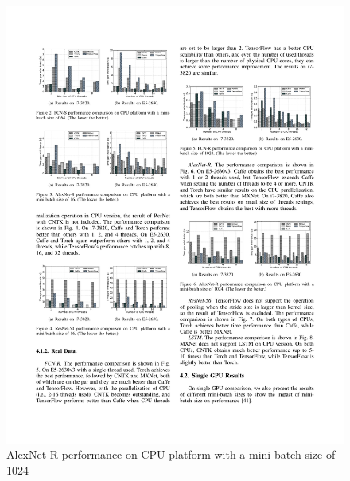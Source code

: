 \documentclass[11pt, oneside]{article}   	%
\begin{document}
\begin{figure}[htbp] 
	\includegraphics[width=\linewidth]{figures/AlexNet-R1.pdf} 
	\caption{AlexNet-R performance on CPU platform with a mini-batch size of 1024}
\end{figure}
%
\end{document}
